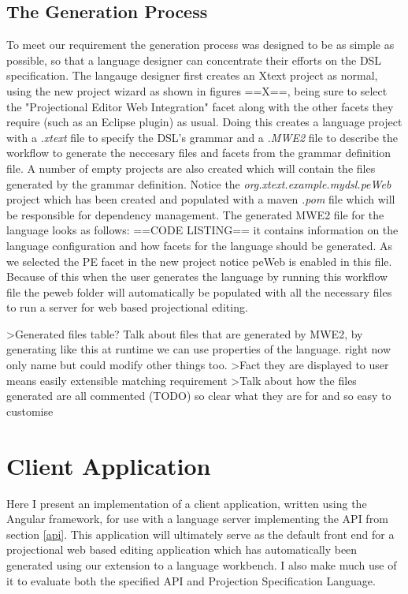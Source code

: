 \documentclass{report}
\begin{document}
\subsection{The Generation Process}
To meet our \RSetup requirement the generation process was designed to be as simple as possible, so that a language designer can concentrate their efforts on the DSL specification. The langauge designer first creates an Xtext project as normal, using the new project wizard as shown in figures ==X==, being sure to select the "Projectional Editor Web Integration" facet along with the other facets they require (such as an Eclipse plugin) as usual.
Doing this creates a language project with a \emph{.xtext} file to specify the DSL's grammar and a \emph{.MWE2} file to describe the workflow to generate the neccesary files and facets from the grammar definition file. A number of empty projects are also created which will contain the files generated by the grammar definition. Notice the \emph{org.xtext.example.mydsl.peWeb} project which has been created and populated with a maven \emph{.pom} file which will be responsible for dependency management.
The generated MWE2 file for the language looks as follows:
==CODE LISTING==
it contains information on the language configuration and how facets for the language should be generated. As we selected the PE facet in the new project notice peWeb is enabled in this file. Because of this when the user generates the language by running this workflow file the peweb folder will automatically be populated with all the necessary files to run a server for web based projectional editing.

>Generated files table? Talk about files that are generated by MWE2, by generating like this at runtime we can use properties of the language. right now only name but could modify other things too.
>Fact they are displayed to user means easily extensible matching requirement \RCustom
>Talk about how the files generated are all commented (TODO) so clear what they are for and so easy to customise \RCustom

\section{Client Application}
Here I present an implementation of a client application, written using the Angular framework, for use with a language server implementing the API from section \ref{api}. This application will ultimately serve as the default front end for a projectional web based editing application which has automatically been generated using our extension to a language workbench. I also make much use of it to evaluate both the specified API and Projection Specification Language. 
\end{document}
